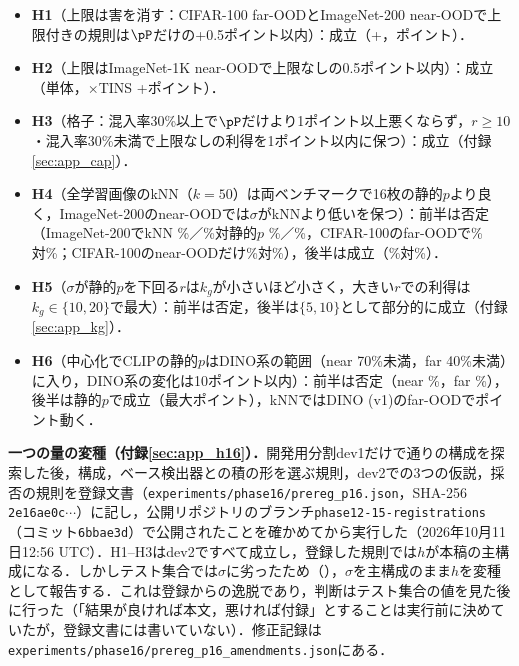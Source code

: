 \begin{itemize}
\item \textbf{H1}（上限は害を消す：CIFAR-100 far-OODとImageNet-200 near-OODで上限付きの規則は$\pP$だけの+0.5ポイント以内）：成立（+\NCifarStoreycFarDfprVsLp{}，\NInTwoZeroZeroStoreycNearDfprVsLp{}ポイント）．
\item \textbf{H2}（上限はImageNet-1K near-OODで上限なしの0.5ポイント以内）：成立（単体\NCapStoreycAloneNearDfprVsStorey{}，$\times$TINS +\NCapStoreycNearDfprVsStorey{}ポイント）．
\item \textbf{H3}（格子：混入率30\%以上で$\pP$だけより1ポイント以上悪くならず，$r\ge10$・混入率30\%未満で上限なしの利得を1ポイント以内に保つ）：成立（付録\ref{sec:app_cap}）．
\item \textbf{H4}（全学習画像のkNN（$k{=}50$）は両ベンチマークで16枚の静的$p$より良く，ImageNet-200のnear-OODでは$\sigma$がkNNより低い\FPR{}を保つ）：前半は否定（ImageNet-200でkNN \NInTwoZeroZeroKnnAllKFiveZeroNearFpr\%／\NInTwoZeroZeroKnnAllKFiveZeroFarFpr\%対静的$p$ \NInTwoZeroZeroStaticNearFpr\%／\NInTwoZeroZeroStaticFarFpr\%，CIFAR-100のfar-OODで\NCifarKnnAllKFiveZeroFarFpr\%対\NCifarStaticFarFpr\%；CIFAR-100のnear-OODだけ\NCifarKnnAllKFiveZeroNearFpr\%対\NCifarStaticNearFpr\%），後半は成立（\NInTwoZeroZeroMainNearFpr\%対\NInTwoZeroZeroKnnAllKFiveZeroNearFpr\%）．
\item \textbf{H5}（$\sigma$が静的$p$を下回る$r$は$k_g$が小さいほど小さく，大きい$r$での利得は$k_g\in\{10,20\}$で最大）：前半は否定，後半は$\{5,10\}$として部分的に成立（付録\ref{sec:app_kg}）．
\item \textbf{H6}（中心化でCLIPの静的$p$はDINO系の範囲（near 70\%未満，far 40\%未満）に入り，DINO系の変化は10ポイント以内）：前半は否定（near \NViewClipStaticcNearFpr\%，far \NViewClipStaticcFarFpr\%），後半は静的$p$で成立（最大\NViewsDinoCentredMaxabsFpr{}ポイント），kNNではDINO (v1)のfar-OODで\NViewsDinoKnncentredMaxabsFpr{}ポイント動く．
\end{itemize}

\textbf{一つの量の変種（付録\ref{sec:app_h16}）．}開発用分割dev1だけで\NHsExplNCfg{}通りの構成を探索した後，構成，ベース検出器との積の形を選ぶ規則，dev2での3つの仮説，採否の規則を登録文書（\texttt{experiments/phase16/prereg\_p16.json}，SHA-256 \texttt{2e16ae0c}$\cdots$）に記し，公開リポジトリのブランチ\texttt{phase12-15-registrations}（コミット\texttt{6bbae3d}）で公開されたことを確かめてから実行した（2026年10月11日12:56 UTC）．H1--H3はdev2ですべて成立し，登録した規則では$h$が本稿の主構成になる．しかしテスト集合では$\sigma$に劣ったため（），$\sigma$を主構成のまま$h$を変種として報告する．これは登録からの逸脱であり，判断はテスト集合の値を見た後に行った（「結果が良ければ本文，悪ければ付録」とすることは実行前に決めていたが，登録文書には書いていない）．修正記録は\texttt{experiments/phase16/prereg\_p16\_amendments.json}にある．
